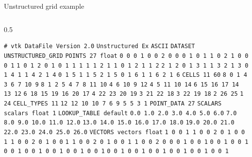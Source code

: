 \documentclass{beamer}
\begin{document}
\begin{frame}{Unstructured grid example}

    \begin{columns}[t]
    \begin{column}{0.5\linewidth}

    \tiny
    \vskip -13pt
    \texttt{\# vtk DataFile Version 2.0}\newline
\texttt{Unstructured Ex}\newline
\texttt{ASCII}\newline
\texttt{DATASET UNSTRUCTURED\_GRID}\newline
\texttt{POINTS 27 float}\newline
\texttt{0 0 0  1 0 0  2 0 0  0 1 0  1 1 0  2 1 0  0 0 1}\newline
\texttt{1 0 1  2 0 1  0 1 1  1 1 1  2 1 1  0 1 2  1 1 2}\newline
\texttt{2 1 2  0 1 3  1 1 3  2 1 3  0 1 4  1 1 4  2 1 4}\newline
\texttt{0 1 5  1 1 5  2 1 5  0 1 6  1 1 6  2 1 6}\newline
\texttt{CELLS 11 60}\newline
\texttt{8 0 1 4 3 6 7 10 9}\newline
\texttt{8 1 2 5 4 7 8 11 10}\newline
\texttt{4 6 10 9 12}\newline
\texttt{4 5 11 10 14}\newline
\texttt{6 15 16 17 14 13 12}\newline
\texttt{6 18 15 19 16 20 17}\newline
\texttt{4 22 23 20 19}\newline
\texttt{3 21 22 18}\newline
\texttt{3 22 19 18}\newline
\texttt{2 26 25}\newline
\texttt{1 24}\newline
\texttt{CELL\_TYPES 11}\newline
\texttt{12 12 10 10 7 6 9 5 5 3 1}\newline
\texttt{POINT\_DATA 27}\newline
\texttt{SCALARS scalars float 1}\newline
\texttt{LOOKUP\_TABLE default}\newline
\texttt{0.0 1.0 2.0 3.0 4.0 5.0 6.0}\newline
\texttt{7.0 8.0 9.0 10.0 11.0 12.0}\newline
\texttt{13.0 14.0 15.0 16.0 17.0 18.0}\newline
\texttt{19.0 20.0 21.0 22.0 23.0 24.0 25.0 26.0}\newline
\texttt{VECTORS vectors float}\newline
\texttt{1 0 0  1 1 0  0 2 0  1 0 0  1 1 0  0 2 0  1 0 0}\newline
\texttt{1 1 0  0 2 0  1 0 0  1 1 0  0 2 0  0 0 1  0 0 1}\newline
\texttt{0 0 1  0 0 1  0 0 1  0 0 1  0 0 1  0 0 1  0 0 1}\newline
\texttt{0 0 1  0 0 1  0 0 1  0 0 1  0 0 1  0 0 1}\newline


\end{column}
\end{columns}
\end{frame}
\end{document}
